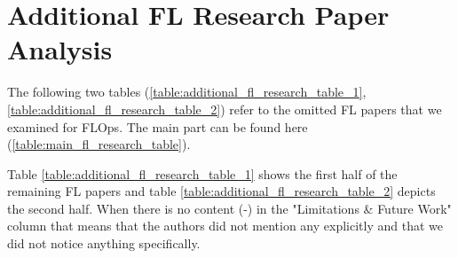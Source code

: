 \appendix
\appendixpage
\addappheadtotoc

\chapter{Additional FL Research Paper Analysis}\label{appendix:fl_research}
The following two tables (\ref{table:additional_fl_research_table_1}, \ref{table:additional_fl_research_table_2}) refer to the omitted FL papers that we examined for FLOps.
The main part can be found here (\ref{table:main_fl_research_table}).

\begin{figure}[p]
    
\end{figure}

\begin{figure}[p]
    
\end{figure}

Table \ref{table:additional_fl_research_table_1} shows the first half of the remaining FL papers and
table \ref{table:additional_fl_research_table_2} depicts the second half.
When there is no content (-) in the "Limitations \& Future Work" column that means that the 
authors did not mention any explicitly and that we did not notice anything specifically.
